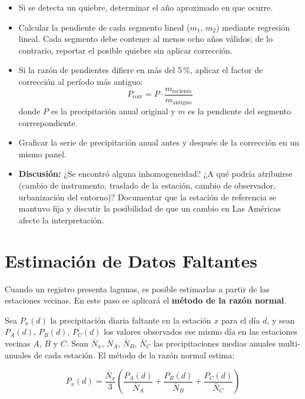 \documentclass[11pt]{article}
\begin{document}
\begin{itemize}
  \item Si se detecta un quiebre, determinar el año aproximado en que ocurre.
  \item Calcular la pendiente de cada segmento lineal ($m_1$, $m_2$) mediante
    regresión lineal. Cada segmento debe contener al menos ocho años válidos;
    de lo contrario, reportar el posible quiebre sin aplicar corrección.
  \item Si la razón de pendientes difiere en más del 5\,\%, aplicar el factor de
    corrección al período más antiguo:
    \[
      P_{\text{corr}} = P \cdot \frac{m_{\text{reciente}}}{m_{\text{antiguo}}}
    \]
    donde $P$ es la precipitación anual original y $m$ es la pendiente del
    segmento correspondiente.
  \item Graficar la serie de precipitación anual antes y después de la corrección
    en un mismo panel.
  \item \textbf{Discusión:} ¿Se encontró alguna inhomogeneidad?
    ¿A qué podría atribuirse (cambio de instrumento, traslado de la estación,
    cambio de observador, urbanización del entorno)? Documentar que la estación
    de referencia se mantuvo fija y discutir la posibilidad de que un cambio en
    Las Américas afecte la interpretación.
\end{itemize}

\section{Estimación de Datos Faltantes}

Cuando un registro presenta lagunas, es posible estimarlas a partir de las estaciones
vecinas.  En este paso se aplicará el \textbf{método de la razón normal}.


Sea $P_x(d)$ la precipitación diaria faltante en la estación $x$ para el día $d$,
y sean $P_A(d)$, $P_B(d)$, $P_C(d)$ los valores observados ese mismo día en las
estaciones vecinas $A$, $B$ y $C$.
Sean $\bar{N}_x$, $\bar{N}_A$, $\bar{N}_B$, $\bar{N}_C$ las precipitaciones medias
anuales multi-anuales de cada estación.  El método de la razón normal estima:

\[
  P_x(d) = \frac{\bar{N}_x}{3}
  \left(
    \frac{P_A(d)}{\bar{N}_A} + \frac{P_B(d)}{\bar{N}_B} + \frac{P_C(d)}{\bar{N}_C}
  \right)
\]
\end{document}
